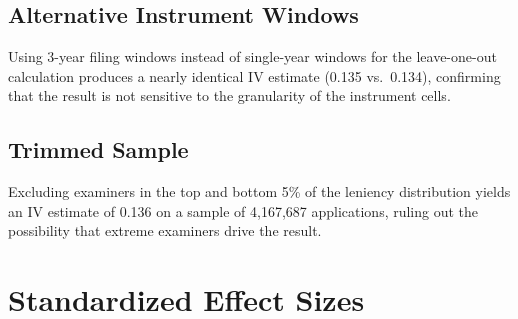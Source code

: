 \documentclass[12pt]{article}
\begin{document}
\subsection{Alternative Instrument Windows}

Using 3-year filing windows instead of single-year windows for the leave-one-out calculation produces a nearly identical IV estimate (0.135 vs.~0.134), confirming that the result is not sensitive to the granularity of the instrument cells.

\subsection{Trimmed Sample}

Excluding examiners in the top and bottom 5\% of the leniency distribution yields an IV estimate of 0.136 on a sample of 4,167,687 applications, ruling out the possibility that extreme examiners drive the result.

\section{Standardized Effect Sizes}
\label{sec:sde}


\end{document}
